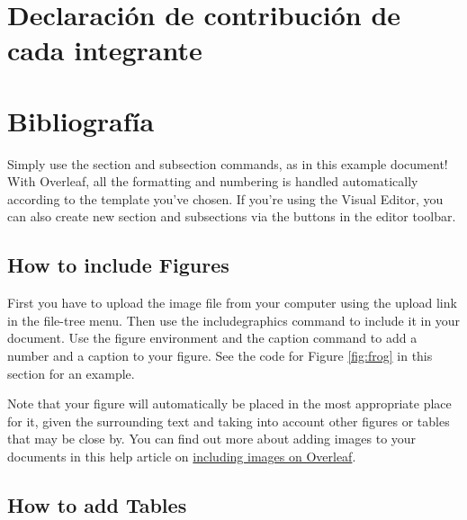 \documentclass[11pt, twocolumn]{article}
\begin{document}
\section{Declaración de contribución de cada integrante}

\section{Bibliografía}

Simply use the section and subsection commands, as in this example document! With Overleaf, all the formatting and numbering is handled automatically according to the template you've chosen. If you're using the Visual Editor, you can also create new section and subsections via the buttons in the editor toolbar.

\subsection{How to include Figures}

First you have to upload the image file from your computer using the upload link in the file-tree menu. Then use the includegraphics command to include it in your document. Use the figure environment and the caption command to add a number and a caption to your figure. See the code for Figure \ref{fig:frog} in this section for an example.

Note that your figure will automatically be placed in the most appropriate place for it, given the surrounding text and taking into account other figures or tables that may be close by. You can find out more about adding images to your documents in this help article on \href{https://www.overleaf.com/learn/how-to/Including_images_on_Overleaf}{including images on Overleaf}.

\subsection{How to add Tables}
\end{document}

